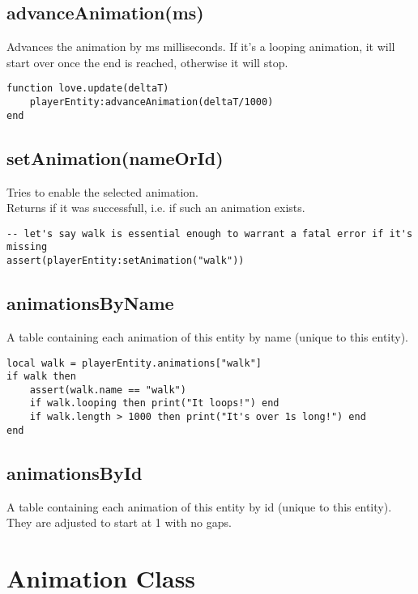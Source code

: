 \documentclass{article}
\begin{document}
\subsection{advanceAnimation(ms)}

Advances the animation by ms milliseconds. If it's a looping animation, it will start over once the end is reached, otherwise it will stop.
\begin{lstlisting}
function love.update(deltaT)
	playerEntity:advanceAnimation(deltaT/1000)
end
\end{lstlisting}


\subsection{setAnimation(nameOrId)}

Tries to enable the selected animation.\\
Returns if it was successfull, i.e. if such an animation exists.

\begin{lstlisting}
-- let's say walk is essential enough to warrant a fatal error if it's missing
assert(playerEntity:setAnimation("walk"))
\end{lstlisting}


\subsection{animationsByName}

A table containing each animation of this entity by name (unique to this entity).
\begin{lstlisting}
local walk = playerEntity.animations["walk"]
if walk then
	assert(walk.name == "walk")
	if walk.looping then print("It loops!") end
	if walk.length > 1000 then print("It's over 1s long!") end
end
\end{lstlisting}


\subsection{animationsById}

A table containing each animation of this entity by id (unique to this entity). They are adjusted to start at 1 with no gaps.



\newpage

		\section{Animation Class}
\end{document}
